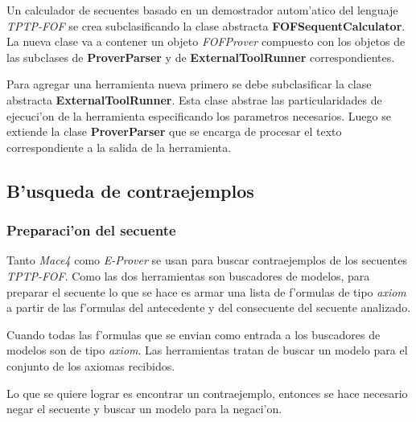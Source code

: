 
Un calculador de secuentes basado en un demostrador autom'atico del lenguaje \textit{TPTP-FOF} se crea subclasificando la clase abstracta \textbf{FOFSequentCalculator}. La nueva clase va a contener un objeto \textit{FOFProver} compuesto con los objetos de las subclases de \textbf{ProverParser} y de \textbf{ExternalToolRunner} correspondientes.

Para agregar una herramienta nueva primero se debe subclasificar la clase abstracta \textbf{ExternalToolRunner}. Esta clase abstrae las particularidades de ejecuci'on de la herramienta especificando los parametros necesarios. Luego se extiende la clase \textbf{ProverParser} que se encarga de procesar el texto correspondiente a la salida de la herramienta. 



\subsection{B'usqueda de contraejemplos}

\subsubsection{Preparaci'on del secuente}

Tanto \textit{Mace4} como \textit{E-Prover} se usan para buscar contraejemplos de los secuentes \textit{TPTP-FOF}. Como las dos herramientas son buscadores de modelos, para preparar el secuente lo que se hace es armar una lista de f'ormulas de tipo \textit{axiom} a partir de las f'ormulas del antecedente y del consecuente del secuente analizado.

Cuando todas las f'ormulas que se envian como entrada a los buscadores de modelos son de tipo \textit{axiom}. Las herramientas tratan de buscar un modelo para el conjunto de los axiomas recibidos.

Lo que se quiere lograr es encontrar un contraejemplo, entonces se hace necesario negar el secuente y buscar un modelo para la negaci'on.

